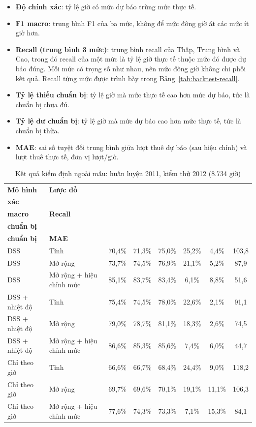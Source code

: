 \begin{itemize}
    \item \textbf{Độ chính xác}: tỷ lệ giờ có mức dự báo trùng mức thực tế.
    \item \textbf{F1 macro}: trung bình F1 của ba mức, không để mức đông giờ át các mức ít giờ hơn.
    \item \textbf{Recall (trung bình 3 mức)}: trung bình recall của Thấp, Trung bình và Cao, trong đó recall của một mức là tỷ lệ giờ thực tế thuộc mức đó được dự báo đúng. Mỗi mức có trọng số như nhau, nên mức đông giờ không chi phối kết quả. Recall từng mức được trình bày trong Bảng~\ref{tab:backtest-recall}.
    \item \textbf{Tỷ lệ thiếu chuẩn bị}: tỷ lệ giờ mà mức thực tế cao hơn mức dự báo, tức là chuẩn bị chưa đủ.
    \item \textbf{Tỷ lệ dư chuẩn bị}: tỷ lệ giờ mà mức dự báo cao hơn mức thực tế, tức là chuẩn bị thừa.
    \item \textbf{MAE}: sai số tuyệt đối trung bình giữa lượt thuê dự báo (sau hiệu chỉnh) và lượt thuê thực tế, đơn vị lượt/giờ.
\end{itemize}

\begin{table}[H]
\centering
\caption{Kết quả kiểm định ngoài mẫu: huấn luyện 2011, kiểm thử 2012 (8.734 giờ)}
\label{tab:backtest}
\small
\begin{tabularx}{\textwidth}{|l|X|c|c|c|c|c|c|}
\hline
\textbf{Mô hình} & \textbf{Lược đồ} & \shortstack{\textbf{Chính}\\\textbf{xác}} & \shortstack{\textbf{F1}\\\textbf{macro}} & \textbf{Recall} & \shortstack{\textbf{Thiếu}\\\textbf{chuẩn bị}} & \shortstack{\textbf{Dư}\\\textbf{chuẩn bị}} & \textbf{MAE} \\ \hline
DSS & Tĩnh & 70,4\% & 71,3\% & 75,0\% & 25,2\% & 4,4\% & 103,8 \\ \hline
DSS & Mở rộng & 73,7\% & 74,5\% & 76,9\% & 21,1\% & 5,2\% & 87,9 \\ \hline
DSS & Mở rộng + hiệu chỉnh mức & 85,1\% & 83,7\% & 83,4\% & 6,1\% & 8,8\% & 51,6 \\ \hline
DSS + nhiệt độ & Tĩnh & 75,4\% & 74,5\% & 78,0\% & 22,6\% & 2,1\% & 91,1 \\ \hline
DSS + nhiệt độ & Mở rộng & 79,0\% & 78,7\% & 81,1\% & 18,3\% & 2,6\% & 74,5 \\ \hline
DSS + nhiệt độ & Mở rộng + hiệu chỉnh mức & 86,6\% & 85,3\% & 85,6\% & 7,4\% & 6,0\% & 44,7 \\ \hline
Chỉ theo giờ & Tĩnh & 66,6\% & 66,7\% & 68,4\% & 24,4\% & 9,0\% & 118,2 \\ \hline
Chỉ theo giờ & Mở rộng & 69,7\% & 69,6\% & 70,1\% & 19,1\% & 11,1\% & 106,3 \\ \hline
Chỉ theo giờ & Mở rộng + hiệu chỉnh mức & 77,6\% & 74,3\% & 73,3\% & 7,1\% & 15,3\% & 84,1 \\ \hline
\end{tabularx}
\end{table}

